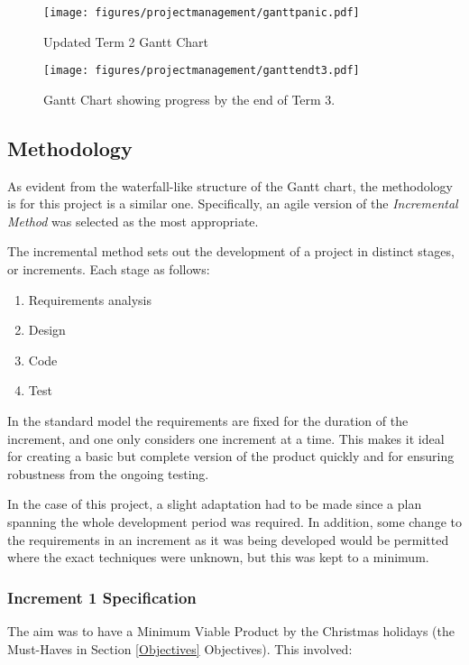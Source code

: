 \documentclass{article}
\begin{document}
\begin{figure}
    \texttt{[image: figures/projectmanagement/ganttpanic.pdf]}
        \caption{Updated Term 2 Gantt Chart}
        \label{fig:gantt2}
\end{figure}

\begin{figure}
    \texttt{[image: figures/projectmanagement/ganttendt3.pdf]}
        \caption{Gantt Chart showing progress by the end of Term 3.}
        \label{fig:gantt3}
\end{figure}

\subsection{Methodology}
As evident from the waterfall-like structure of the Gantt chart, the methodology is for this project is a similar one. Specifically, an agile version of the \textit{Incremental Method} \cite{management:incremental} was selected as the most appropriate. 

The incremental method sets out the development of a project in distinct stages, or increments. Each stage as follows:
\begin{enumerate}
    \item Requirements analysis
    \item Design
    \item Code 
    \item Test
\end{enumerate}
In the standard model the requirements are fixed for the duration of the increment, and one only considers one increment at a time. This makes it ideal for creating a basic but complete version of the product quickly and for ensuring robustness from the ongoing testing. 

In the case of this project, a slight adaptation had to be made since a plan spanning the whole development period was required. In addition, some change to the requirements in an increment as it was being developed would be permitted where the exact techniques were unknown, but this was kept to a minimum.  

\subsubsection{Increment 1 Specification}
The aim was to have a Minimum Viable Product by the Christmas holidays (the Must-Haves in Section \ref{Objectives} Objectives). This involved:
\end{document}
